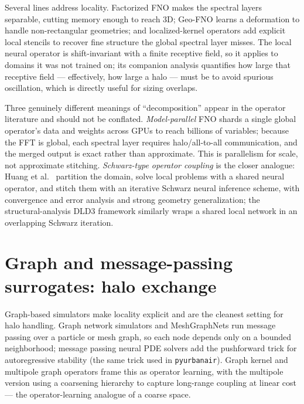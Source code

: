 \documentclass[11pt]{article}
\begin{document}
Several lines address locality. Factorized FNO \cite{tran2023ffno} makes the
spectral layers separable, cutting memory enough to reach 3D; Geo-FNO
\cite{li2023geofno} learns a deformation to handle non-rectangular geometries;
and localized-kernel operators \cite{liuschiaffini2024localized} add explicit
local stencils to recover fine structure the global spectral layer misses. The
local neural operator \cite{ye2024lno} is shift-invariant with a finite
receptive field, so it applies to domains it was not trained on; its companion
analysis quantifies how large that receptive field --- effectively, how large a
halo --- must be to avoid spurious oscillation, which is directly useful for
sizing overlaps.

Three genuinely different meanings of ``decomposition'' appear in the operator
literature and should not be conflated. \emph{Model-parallel} FNO
\cite{grady2023modelparallelfno} shards a single global operator's data and
weights across GPUs to reach billions of variables; because the FFT is global,
each spectral layer requires halo/all-to-all communication, and the merged
output is exact rather than approximate. This is parallelism for scale, not
approximate stitching. \emph{Schwarz-type operator coupling} is the closer
analogue: Huang et al.\ \cite{huang2025operatorddm} partition the domain, solve
local problems with a shared neural operator, and stitch them with an iterative
Schwarz neural inference scheme, with convergence and error analysis and strong
geometry generalization; the structural-analysis DLD3 framework
\cite{klawonn2024dld3} similarly wraps a shared local network in an overlapping
Schwarz iteration.

\section{Graph and message-passing surrogates: halo exchange}

Graph-based simulators make locality explicit and are the cleanest setting for
halo handling. Graph network simulators \cite{sanchezgonzalez2020gns} and
MeshGraphNets \cite{pfaff2021meshgraphnets} run message passing over a particle
or mesh graph, so each node depends only on a bounded neighborhood; message
passing neural PDE solvers \cite{brandstetter2022mppde} add the pushforward trick
for autoregressive stability (the same trick used in \texttt{pyurbanair}). Graph
kernel \cite{li2020gno} and multipole graph \cite{li2020mgno} operators frame
this as operator learning, with the multipole version using a coarsening
hierarchy to capture long-range coupling at linear cost --- the operator-learning
analogue of a coarse space.
\end{document}
